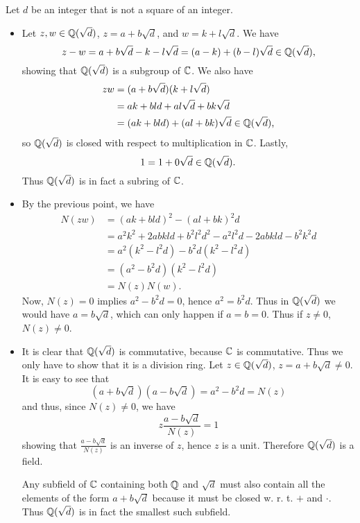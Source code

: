 \begin{solution}
	Let $d$ be an integer that is not a square of an integer.
	\begin{itemize}
		\item Let $z, w \in \mathbb{Q}(\sqrt{d})$, $z = a + b \sqrt{d}$, and $w = k + l \sqrt{d}$. We have
		\[
			z - w = a + b \sqrt{d} - k - l \sqrt{d} = (a - k) + (b - l) \sqrt{d} \in \mathbb{Q}(\sqrt{d}) \text{,}
		\]
		showing that $\mathbb{Q}(\sqrt{d})$ is a subgroup of $\mathbb{C}$. We also have
		\begin{align*}
			zw &= (a + b \sqrt{d})(k + l \sqrt{d}) \\
			&= ak + bld + al \sqrt{d} + bk \sqrt{d} \\
			&= (ak + bld) + (al + bk) \sqrt{d} \in \mathbb{Q}(\sqrt{d}) \text{,}
		\end{align*}
		so $\mathbb{Q}(\sqrt{d})$ is closed with respect to multiplication in $\mathbb{C}$. Lastly,
		\[
			1 = 1 + 0 \sqrt{d} \in \mathbb{Q}(\sqrt{d}) \text{.}
		\]
		Thus $\mathbb{Q}(\sqrt{d})$ is in fact a subring of $\mathbb{C}$.
		
		\item By the previous point, we have
		\begin{align*}
			N(zw) &= (ak + bld)^2 - (al + bk)^2d \\
			&= a^2 k^2 + 2 abkld + b^2 l^2 d^2 - a^2 l^2 d - 2abkld - b^2 k^2 d \\
			&= a^2 (k^2 - l^2 d) - b^2d (k^2 - l^2 d) \\
			&= (a^2 - b^2 d)(k^2 - l^2 d) \\
			&= N(z) N(w) \text{.}
		\end{align*}
		Now, $N(z) = 0$ implies $a^2 - b^2 d = 0$, hence $a^2 = b^2 d$. Thus in $\mathbb{Q}(\sqrt{d})$ we would have $a = b \sqrt{d}$, which can only happen if $a = b = 0$. Thus if $z \neq 0$, $N(z) \neq 0$.
		
		\item It is clear that $\mathbb{Q}(\sqrt{d})$ is commutative, because $\mathbb{C}$ is commutative. Thus we only have to show that it is a division ring. Let $z \in \mathbb{Q}(\sqrt{d})$, $z = a + b \sqrt{d} \neq 0$. It is easy to see that
		\[
			(a + b \sqrt{d})(a - b \sqrt{d}) = a^2 - b^2 d = N(z)
		\]
		and thus, since $N(z) \neq 0$, we have
		\[
			z \frac{a - b \sqrt{d}}{N(z)} = 1
		\]
		showing that $\frac{a - b \sqrt{d}}{N(z)}$ is an inverse of $z$, hence $z$ is a unit. Therefore $\mathbb{Q}(\sqrt{d})$ is a field.
		
		Any subfield of $\mathbb{C}$ containing both $\mathbb{Q}$ and $\sqrt{d}$ must also contain all the elements of the form $a + b \sqrt{d}$ because it must be closed w. r. t. $+$ and $\cdot$. Thus $\mathbb{Q}(\sqrt{d})$ is in fact the smallest such subfield.
			

\end{itemize}
\end{solution}

